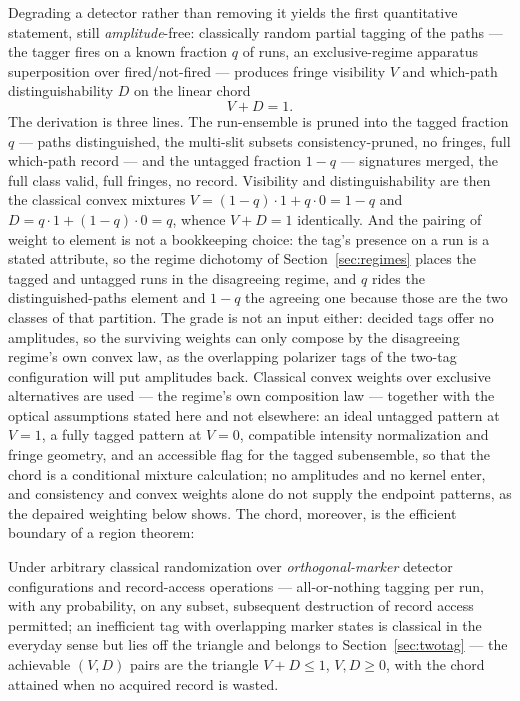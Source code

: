 Degrading a detector rather than removing it yields the first quantitative statement, still \emph{amplitude}-free: classically random partial tagging of the paths --- the tagger fires on a known fraction $q$ of runs, an exclusive-regime apparatus superposition over fired/not-fired --- produces fringe visibility $V$ and which-path distinguishability $D$ on the linear chord
\begin{equation}\label{eq:chord}
V + D = 1.
\end{equation}
The derivation is three lines. The run-ensemble is pruned into the tagged fraction $q$ --- paths distinguished, the multi-slit subsets consistency-pruned, no fringes, full which-path record --- and the untagged fraction $1-q$ --- signatures merged, the full class valid, full fringes, no record. Visibility and distinguishability are then the classical convex mixtures $V = (1-q)\cdot 1 + q\cdot 0 = 1-q$ and $D = q\cdot 1 + (1-q)\cdot 0 = q$, whence $V + D = 1$ identically. And the pairing of weight to element is not a bookkeeping choice: the tag's presence on a run is a stated attribute, so the regime dichotomy of Section~\ref{sec:regimes} places the tagged and untagged runs in the disagreeing regime, and $q$ rides the distinguished-paths element and $1-q$ the agreeing one because those are the two classes of that partition. The grade is not an input either: decided tags offer no amplitudes, so the surviving weights can only compose by the disagreeing regime's own convex law, as the overlapping polarizer tags of the two-tag configuration will put amplitudes back. Classical convex weights over exclusive alternatives are used --- the regime's own composition law --- together with the optical assumptions stated here and not elsewhere: an ideal untagged pattern at $V = 1$, a fully tagged pattern at $V = 0$, compatible intensity normalization and fringe geometry, and an accessible flag for the tagged subensemble, so that the chord is a conditional mixture calculation; no amplitudes and no kernel enter, and consistency and convex weights alone do not supply the endpoint patterns, as the depaired weighting below shows. The chord, moreover, is the efficient boundary of a region theorem:
\begin{theorem}\label{thm:triangle}
Under arbitrary classical randomization over \emph{orthogonal-marker} detector configurations and record-access operations --- all-or-nothing tagging per run, with any probability, on any subset, subsequent destruction of record access permitted; an inefficient tag with overlapping marker states is classical in the everyday sense but lies off the triangle and belongs to Section~\ref{sec:twotag} --- the achievable $(V, D)$ pairs are the triangle $V + D \le 1$, $V, D \ge 0$, with the chord attained when no acquired record is wasted.
\end{theorem}
